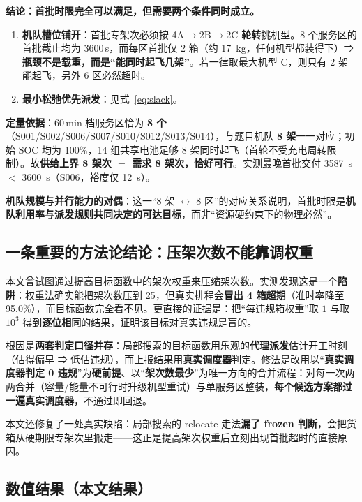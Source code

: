 \textbf{结论：首批时限完全可以满足，但需要两个条件同时成立。}

\begin{enumerate}[label=\textbf{条件 \arabic*},leftmargin=2em]
	\item \textbf{机队槽位铺开}：首批专架次必须按 4A$\to$2B$\to$2C \textbf{轮转}挑机型。8 个服务区的首批截止均为 3600\,s，而每区首批仅 2 箱（约 \SI{17}{kg}，任何机型都装得下）⇒ \textbf{瓶颈不是载重，而是“能同时起飞几架”}。若一律取最大机型 C，则只有 2 架能起飞，另外 6 区必然超时。
	\item \textbf{最小松弛优先派发}：见式~\eqref{eq:slack}。
\end{enumerate}

\textbf{定量依据}：60\,min 档服务区恰为 \textbf{8 个}（S001/S002/S006/S007/S010/S012/S013/S014），与题目机队 \textbf{8 架}一一对应；初始 SOC 均为 100\%，14 组共享电池足够 8 架同时起飞（首轮不受充电周转限制）。故\textbf{供给上界 8 架次 $=$ 需求 8 架次，恰好可行}。实测最晚首批交付 \SI{3587}{s} $<$ \SI{3600}{s}（S006，裕度仅 \SI{12}{s}）。

\textbf{机队规模与并行能力的对偶}：这一“8 架 $\leftrightarrow$ 8 区”的对应关系说明，首批时限是\textbf{机队利用率与派发规则共同决定的可达目标}，而非“资源硬约束下的物理必然”。

\subsection{一条重要的方法论结论：压架次数不能靠调权重}\label{sec:q2weight}

本文曾试图通过提高目标函数中的架次权重来压缩架次数。实测发现这是一个\textbf{陷阱}：权重法确实能把架次数压到 25，但真实排程会\textbf{冒出 4 箱超期}（准时率降至 95.0\%），而目标函数完全看不见。更直接的证据是：把“每违规箱权重”取 $1$ 与取 $10^{3}$ 得到\textbf{逐位相同}的结果，证明该目标对真实违规是盲的。

根因是\textbf{两套判定口径并存}：局部搜索的目标函数用乐观的\textbf{代理派发}估计开工时刻（估得偏早 ⇒ 低估违规），而上报结果用\textbf{真实调度器}判定。修法是改用以“\textbf{真实调度器判定 0 违规}”为\textbf{硬前提}、以“\textbf{架次数最少}”为唯一方向的合并流程：对每一次两两合并（容量/能量不可行时升级机型重试）与单服务区整装，\textbf{每个候选方案都过一遍真实调度器}，不通过即回退。

本文还修复了一处真实缺陷：局部搜索的 relocate 走法\textbf{漏了 frozen 判断}，会把货箱从硬期限专架次里搬走——这正是提高架次权重后立刻出现首批超时的直接原因。

\subsection{数值结果（本文结果）}

